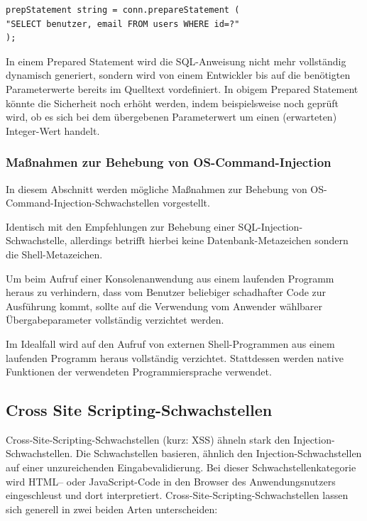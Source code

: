 \begin{lstlisting}[basicstyle=\ttfamily\footnotesize]
prepStatement string = conn.prepareStatement (
"SELECT benutzer, email FROM users WHERE id=?"
);
\end{lstlisting}

In einem Prepared Statement wird die SQL-Anweisung nicht mehr vollständig dynamisch generiert, sondern wird von einem Entwickler bis auf die benötigten Parameterwerte bereits im Quelltext vordefiniert. In obigem Prepared Statement könnte die Sicherheit noch erhöht werden, indem beispielsweise noch geprüft wird, ob es sich bei dem übergebenen Parameterwert um einen (erwarteten) Integer-Wert handelt.

\subsubsection{Maßnahmen zur Behebung von OS-Command-Injection}

In diesem Abschnitt werden mögliche Maßnahmen zur Behebung von OS-Command-Injection-Schwachstellen vorgestellt.


Identisch mit den Empfehlungen zur Behebung einer SQL-Injection-Schwachstelle, allerdings betrifft hierbei keine Datenbank-Metazeichen sondern die Shell-Metazeichen.


Um beim Aufruf einer Konsolenanwendung aus einem laufenden Programm heraus zu verhindern, dass vom Benutzer beliebiger schadhafter Code zur Ausführung kommt, sollte auf die Verwendung vom Anwender wählbarer Übergabeparameter vollständig verzichtet werden.


Im Idealfall wird auf den Aufruf von externen Shell-Programmen aus einem laufenden Programm heraus vollständig verzichtet. Stattdessen werden native Funktionen der verwendeten Programmiersprache verwendet.


\subsection{Cross Site Scripting-Schwachstellen}

Cross-Site-Scripting-Schwachstellen (kurz: XSS) ähneln stark den Injection-Schwachstellen. Die Schwachstellen basieren, ähnlich den Injection-Schwachstellen auf einer unzureichenden Eingabevalidierung. Bei dieser Schwachstellenkategorie wird HTML– oder JavaScript-Code in den Browser des Anwendungsnutzers eingeschleust und dort interpretiert. Cross-Site-Scripting-Schwachstellen lassen sich generell in zwei beiden Arten unterscheiden:


